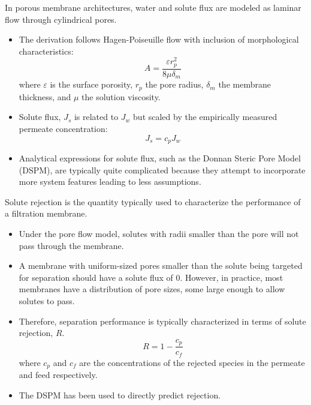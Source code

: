   In porous membrane architectures, water and solute flux are modeled as laminar flow through 
  cylindrical pores.
  \begin{itemize}
    \item The derivation follows Hagen-Poiseuille flow with inclusion of morphological
    characteristics:~\cite{baker_membrane_2012}
    \begin{equation}
      A = \frac{\varepsilon r_p^2}{8\mu\delta_m}
    \end{equation}
    where $\varepsilon$ is the surface porosity, $r_p$ the pore radius, $\delta_m$ the
    membrane thickness, and $\mu$ the solution viscosity.
    \item Solute flux, $J_s$ is related to $J_w$ but scaled by the empirically measured
    permeate concentration:
    \begin{equation}
    J_s = c_p J_w
    \end{equation}
    \item Analytical expressions for solute flux, such as the Donnan Steric Pore Model (DSPM), 
    are typically quite complicated because they attempt to incorporate more system features
    leading to less assumptions.~\cite{bowen_modelling_2002}
  \end{itemize}
  
  Solute rejection is the quantity typically used to characterize the performance of a 
  filtration membrane.
  \begin{itemize}
    \item Under the pore flow model, solutes with radii smaller than the pore will not 
    pass through the membrane. 
    \item A membrane with uniform-sized pores smaller than the solute being targeted 
    for separation should have a solute flux of 0. However, in practice, most membranes
    have a distribution of pore sizes, some large enough to allow solutes to pass.
    \item Therefore, separation performance is typically characterized in terms of solute
    rejection, $R$. 
    \begin{equation}
      R = 1 - \frac{c_p}{c_f}
    \end{equation}
    where $c_p$ and $c_f$ are the concentrations of the rejected species in
    the permeate and feed respectively.
    \item The DSPM has been used to directly predict rejection.~\cite{hatakeyama_water_2011,bowen_modelling_2002}
  \end{itemize}
  
